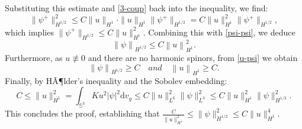 \documentclass[a4paper, 12pt]{article}
\begin{document}
Substituting this estimate and \eqref{3-coup} back into the inequality, we find:
\[ \|\psi^+\|_{H^{1/2}}^2 \leq C \|u\|_{H^1} \cdot \|u\|_{H^1} \|\psi^+\|_{H^{1/2}} = C \|u\|_{H^1}^2 \|\psi^+\|_{H^{1/2}}, \]
which implies $\|\psi^+\|_{H^{1/2}} \leq C \|u\|_{H^1}^2$. Combining this with \eqref{psi-psi}, we deduce
\[{\left\| \psi  \right\|_{{H^{1/2}}}} \leq C\left\| u \right\|_{{H^1}}^2.\]
Furthermore, as $u\not \equiv 0$ and there are no harmonic spinors, from \eqref{u-psi} we obtain
\[{\left\| \psi  \right\|_{{H^{1/2}}}} \geq C\quad and\quad {\left\| u \right\|_{{H^1}}} \geq C.\]
Finally, by HÃ¶lder's inequality and the Sobolev embedding:
\[ C\leq\|u\|_{H^1}^2 = \int_{\mathbb{S}^3} K u^2 |\psi|^2 \text{d}v_g\leq C \|u\|_{L^6}^2 \|\psi\|_{L^3}^2 \leq C \|u\|_{H^1}^2 \|\psi\|_{H^{1/2}}^2. \]
This concludes the proof, establishing that $\frac{C}{\|u\|_{H^1}^2} \leq \|\psi\|_{H^{1/2}}^2 \leq C \|u\|_{H^1}^4$.
\end{document}

